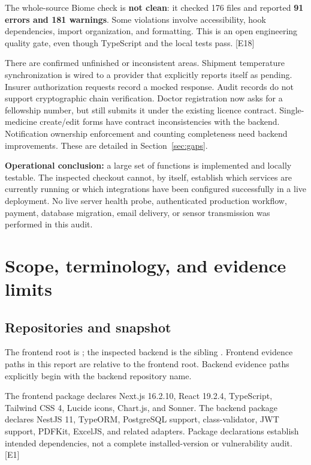 \documentclass[11pt,a4paper]{article}
\newcommand{\source}[1]{{\small\path{#1}}}
\newcommand{\evidence}[1]{\textcolor{muted}{[E#1]}}
\begin{document}
The whole-source Biome check is \textbf{not clean}: it checked 176 files and reported \textbf{91 errors and 181 warnings}. Some violations involve accessibility, hook dependencies, import organization, and formatting. This is an open engineering quality gate, even though TypeScript and the local tests pass. \evidence{18}

There are confirmed unfinished or inconsistent areas. Shipment temperature synchronization is wired to a provider that explicitly reports itself as pending. Insurer authorization requests record a mocked response. Audit records do not support cryptographic chain verification. Doctor registration now asks for a fellowship number, but still submits it under the existing licence contract. Single-medicine create/edit forms have contract inconsistencies with the backend. Notification ownership enforcement and counting completeness need backend improvements. These are detailed in Section~\ref{sec:gaps}.

\textbf{Operational conclusion:} a large set of functions is implemented and locally testable. The inspected checkout cannot, by itself, establish which services are currently running or which integrations have been configured successfully in a live deployment. No live server health probe, authenticated production workflow, payment, database migration, email delivery, or sensor transmission was performed in this audit.

\section{Scope, terminology, and evidence limits}
\subsection{Repositories and snapshot}
The frontend root is \source{oncology_bridge}; the inspected backend is the sibling \source{oncology_bridge_backend}. Frontend evidence paths in this report are relative to the frontend root. Backend evidence paths explicitly begin with the backend repository name.

The frontend package declares Next.js 16.2.10, React 19.2.4, TypeScript, Tailwind CSS 4, Lucide icons, Chart.js, and Sonner. The backend package declares NestJS 11, TypeORM, PostgreSQL support, class-validator, JWT support, PDFKit, ExcelJS, and related adapters. Package declarations establish intended dependencies, not a complete installed-version or vulnerability audit. \evidence{1}
\end{document}
